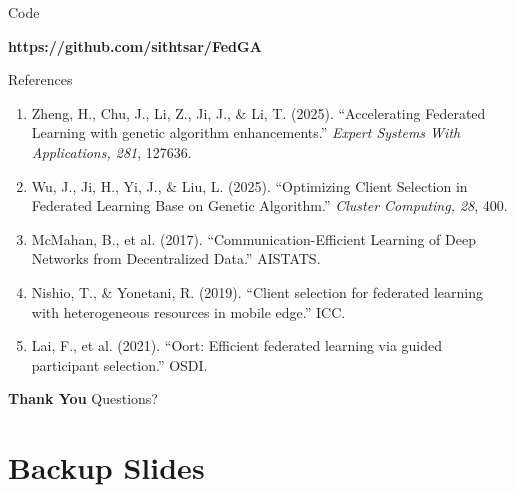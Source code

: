 \documentclass{beamer}
\begin{document}
\begin{frame}{Code}
\begin{center}
\Large \textbf{https://github.com/sithtsar/FedGA}
\vspace{1cm}
\end{center}
\end{frame}


\begin{frame}{References}
\small
\begin{enumerate}
    \item Zheng, H., Chu, J., Li, Z., Ji, J., \& Li, T. (2025). ``Accelerating Federated Learning with genetic algorithm enhancements.'' \textit{Expert Systems With Applications, 281}, 127636.
    \item Wu, J., Ji, H., Yi, J., \& Liu, L. (2025). ``Optimizing Client Selection in Federated Learning Base on Genetic Algorithm.'' \textit{Cluster Computing, 28}, 400.
    \item McMahan, B., et al. (2017). ``Communication-Efficient Learning of Deep Networks from Decentralized Data.'' AISTATS.
    \item Nishio, T., \& Yonetani, R. (2019). ``Client selection for federated learning with heterogeneous resources in mobile edge.'' ICC.
    \item Lai, F., et al. (2021). ``Oort: Efficient federated learning via guided participant selection.'' OSDI.
\end{enumerate}
\end{frame}

\begin{frame}
\begin{center}
\Large \textbf{Thank You}
\vspace{1cm}
\normalsize
Questions?
\end{center}
\end{frame}

\appendix
\section*{Backup Slides}
\end{document}

